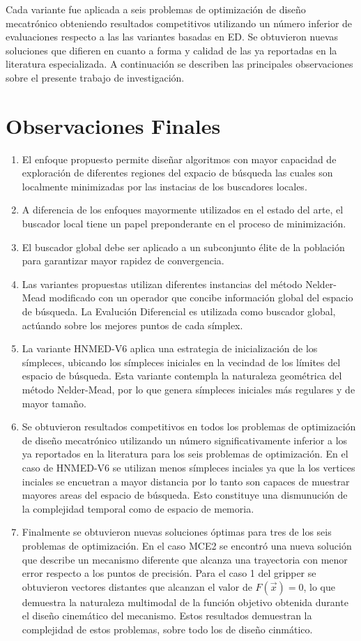 Cada variante fue aplicada a seis problemas de optimización de diseño mecatrónico obteniendo resultados competitivos utilizando un número inferior de evaluaciones respecto a las las variantes basadas en ED. Se obtuvieron nuevas soluciones que difieren en cuanto a forma y calidad de las ya reportadas en la literatura especializada. A continuación se describen las principales observaciones sobre el presente trabajo de investigación.
\section{Observaciones Finales}
\begin{enumerate}
	\item El enfoque propuesto permite diseñar algoritmos con mayor capacidad de exploración de diferentes regiones del expacio de búsqueda las cuales son localmente minimizadas por las instacias de los buscadores locales.
	\item A diferencia de los enfoques mayormente utilizados en el estado del arte, el buscador local tiene un papel preponderante en el proceso de minimización.
	\item El buscador global debe ser aplicado a un subconjunto élite de la población para garantizar mayor rapidez de convergencia.
	 \item Las variantes propuestas utilizan diferentes instancias del método Nelder-Mead modificado con un operador que concibe información global del espacio de búsqueda. La Evalución Diferencial es utilizada como buscador global, actúando sobre los mejores puntos de cada símplex.
	 \item La variante HNMED-V6 aplica una estrategia de inicialización de los símpleces, ubicando los símpleces iniciales en la vecindad de los límites del espacio de búsqueda. Esta variante contempla la naturaleza geométrica del método Nelder-Mead, por lo que genera símpleces iniciales más regulares y de mayor tamaño. 
	 \item Se obtuvieron resultados competitivos en todos los problemas de optimización de diseño mecatrónico utilizando un número significativamente inferior a los ya reportados en la literatura para los seis problemas de optimización. En el caso de HNMED-V6 se utilizan menos símpleces inciales ya que la los vertices inciales se encuetran a mayor distancia por lo tanto son capaces de muestrar mayores areas del espacio de búsqueda. Esto constituye una dismunución de la complejidad temporal como de espacio de memoria.
	 \item Finalmente se obtuvieron nuevas soluciones óptimas para tres de los seis problemas de optimización. En el  caso MCE2 se encontró una nueva solución que describe un mecanismo diferente que alcanza una trayectoria con menor error respecto a los puntos de precisión. Para el caso 1 del gripper se obtuvieron vectores distantes que alcanzan el valor de $F(\vec{x})=0$, lo que demuestra la naturaleza multimodal de la función objetivo obtenida durante el diseño cinemático del mecanismo. Estos resultados demuestran la complejidad de estos problemas, sobre todo los de diseño cinmático. 
\end{enumerate}  
	 
